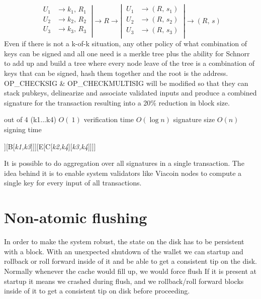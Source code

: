 \documentclass{article}
\begin{document}
\begin{equation}
\left.
    \begin{aligned}
        U_{1} &\rightarrow k_{1},\, R_{1} \\
        U_{2} &\rightarrow k_{2},\, R_{2} \\
        U_{3} &\rightarrow k_{3},\, R_{3} \\
    \end{aligned}
\
\right|
\longrightarrow
R
\longrightarrow
\left|
\
    \begin{aligned}
        U_{1} &\rightarrow (R,\, s_{1}) \\
        U_{2} &\rightarrow (R,\, s_{2}) \\
        U_{3} &\rightarrow (R,\, s_{3}) \\
    \end{aligned}
\
\right|
\longrightarrow
(R,\, s)
\end{equation}
\newline
\noindent Even if there is not a k-of-k situation, any other policy of what combination of
keys can be signed and all one need is a merkle tree plus the ability for Schnorr
to add up and build a tree where every node leave of the tree is a combination of
keys that can be signed, hash them together and the root is the address.
OP\_CHECKSIG \& OP\_CHECKMULTISIG will be modified so that they can stack
pubkeys, delinearize and associate validated inputs and produce a
combined signature for the transaction resulting into a 20\% reduction in block
size.\newline

\noindent 2 out of 4 (k1...k4)\newline \linebreak
$O(~1)$ verification time\newline
$O(\log{}n)$ signature size\newline
$O(n)$ signing time
\newline \newline \noindent
\begin{forest}
    [Root[D[A[\textit{k1,k2}]][B[\textit{k1,k3}]]][E[C[\textit{k2,k4}][\textit{k3,k4}]]]]
\end{forest}
\newline
It is possible to do aggregation over all signatures in a single transaction. The
idea behind it is to enable system validators like Viacoin nodes to compute a
single key for every input of all transactions.
\newpage

\section{Non-atomic flushing}\label{Non-atomic flushing}
In order to make the system robust, the state on the disk has to be persistent
with a block. With an unexpected shutdown of the wallet we can startup and
rollback or roll forward inside of it and be able to get a consistent tip on the disk.
Normally whenever the cache would fill up, we would force flush
If it is present at startup it means we crashed during flush, and we rollback/roll
forward blocks inside of it to get a consistent tip on disk before proceeding.
\end{document}
